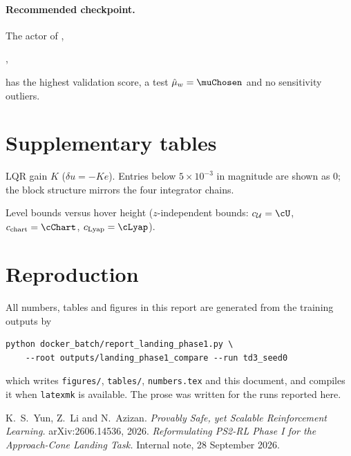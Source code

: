 \documentclass[11pt,a4paper]{article}
\newcommand{\U}{\mathcal{U}}
\newcommand{\tabfit}[1]{\begin{adjustbox}{max width=\linewidth}\end{adjustbox}}
\begin{document}
\paragraph{Recommended checkpoint.} The actor of \runChosen,
\begin{center}\small{},\end{center}
has the highest validation score, a test $\hat\mu_w=\muChosen$ and no sensitivity outliers.

\appendix
\section{Supplementary tables}

\begin{table}[H]
\centering\small
\caption{LQR gain $K$ ($\delta u=-Ke$). Entries below $5\times10^{-3}$ in magnitude are shown as 0; the
block structure mirrors the four integrator chains.}
\label{tab:gain}
\tabfit{gain}
\end{table}

\begin{table}[H]
\centering\small
\caption{Level bounds versus hover height ($z$-independent bounds: $c_{\U}=\cU$, $c_{\mathrm{chart}}=\cChart$,
$c_{\mathrm{Lyap}}=\cLyap$).}
\label{tab:zsweep}

\end{table}

\section{Reproduction}
All numbers, tables and figures in this report are generated from the training outputs by
\begin{verbatim}
python docker_batch/report_landing_phase1.py \
    --root outputs/landing_phase1_compare --run td3_seed0
\end{verbatim}
which writes \texttt{figures/}, \texttt{tables/}, \texttt{numbers.tex} and this document, and compiles it
when \texttt{latexmk} is available. The prose was written for the runs reported here.

\begin{thebibliography}{9}
 K.~S.~Yun, Z.~Li and N.~Azizan. \emph{Provably Safe, yet Scalable Reinforcement Learning.}
arXiv:2606.14536, 2026.
 \emph{Reformulating PS2-RL Phase I for the Approach-Cone Landing Task.} Internal note,
28 September 2026.
\end{thebibliography}
\end{document}
